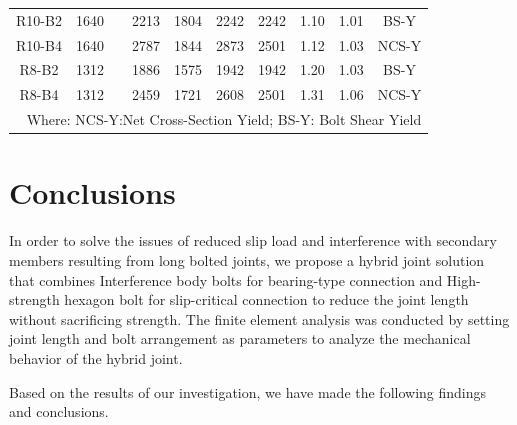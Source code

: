 \begin{table}[htbp]
{\begin{tabular}{@{}cccccccccc@{}}
R10-B2    & 1640 &                       & 2213 & 1804 & 2242 & 2242 & 1.10 & 1.01 & BS-Y    \\
R10-B4    & 1640 &                       & 2787 & 1844 & 2873 & 2501 & 1.12 & 1.03 & NCS-Y \\
R8-B2     & 1312 &                       & 1886 & 1575 & 1942 & 1942 & 1.20 & 1.03 & BS-Y    \\
R8-B4     & 1312 &                       & 2459 & 1721 & 2608 & 2501 & 1.31 & 1.06 & NCS-Y \\ \bottomrule
\multicolumn{10}{r}{Where: NCS-Y:Net Cross-Section Yield; BS-Y: Bolt Shear Yield}
\end{tabular}}
\end{table}



\section{Conclusions}

In order to solve the issues of reduced slip load and interference with secondary members resulting from long bolted joints, we propose a hybrid joint solution that combines Interference body bolts for bearing-type connection and High-strength hexagon bolt for slip-critical connection to reduce the joint length without sacrificing strength. The finite element analysis was conducted by setting joint length and bolt arrangement as parameters to analyze the mechanical behavior of the hybrid joint. 

Based on the results of our investigation, we have made the following findings and conclusions. \par

